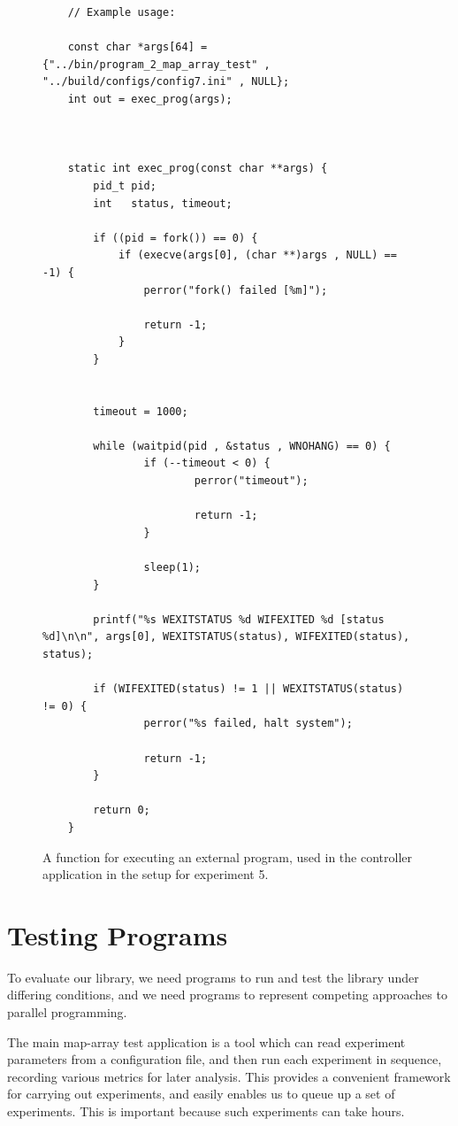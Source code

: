 \begin{figure}
	\begin{lstlisting}
	// Example usage: 

	const char *args[64] = {"../bin/program_2_map_array_test" , "../build/configs/config7.ini" , NULL};
    int out = exec_prog(args);



	static int exec_prog(const char **args) {
	    pid_t pid;
	    int   status, timeout;

	    if ((pid = fork()) == 0) {
	        if (execve(args[0], (char **)args , NULL) == -1) {
	            perror("fork() failed [%m]");

	            return -1;
	        }
	    }


	    timeout = 1000;

	    while (waitpid(pid , &status , WNOHANG) == 0) {
	            if (--timeout < 0) {
	                    perror("timeout");

	                    return -1;
	            }

	            sleep(1);
	    }

	    printf("%s WEXITSTATUS %d WIFEXITED %d [status %d]\n\n", args[0], WEXITSTATUS(status), WIFEXITED(status), status);

	    if (WIFEXITED(status) != 1 || WEXITSTATUS(status) != 0) {
	            perror("%s failed, halt system");

	            return -1;
	    }

	    return 0;
	}
	\end{lstlisting}

	\caption{A function for executing an external program, used in the controller application in the setup for experiment 5.}
	\label{fig:implementation_execute_external_program}
\end{figure}




\section{Testing Programs}

To evaluate our library, we need programs to run and test the library under differing conditions, and we need programs to represent competing approaches to parallel programming. 

The main map-array test application is a tool which can read experiment parameters from a configuration file, and then run each experiment in sequence, recording various metrics for later analysis. This provides a convenient framework for carrying out experiments, and easily enables us to queue up a set of experiments. This is important because such experiments can take hours.

